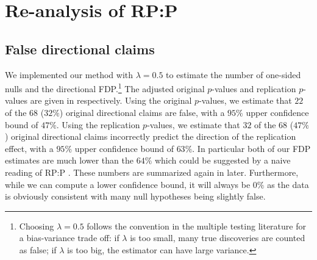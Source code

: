 \documentclass[11pt]{article}
\theoremstyle{definition}
\theoremstyle{custom}
\begin{document}
\section{Re-analysis of RP:P}
\label{sec:analysis}

\subsection{False directional claims}

  We implemented our method with $\lambda = 0.5$ to estimate the number of one-sided nulls and the directional FDP.\footnote{Choosing $\lambda = 0.5$ follows the convention in the multiple testing literature for a bias-variance trade off: if $\lambda$ is too small, many true discoveries are counted as false; if $\lambda$ is too big, the estimator can have large variance.} The adjusted original $p$-values and replication $p$-values are given in  respectively. Using the original $p$-values, we estimate that $22$ of the $68$ ($32\%$) original directional claims are false, with a $95\%$ upper confidence bound of $47\%$. Using the replication $p$-values, we estimate that $32$ of the $68$ ($47\%$) original directional claims incorrectly predict the direction of the replication effect, with a $95\%$ upper confidence bound of $63\%$. In particular both of our FDP estimates are much lower than the $64\%$ which could be suggested by a naive reading of RP:P \citep[e.g.][]{Baker:2015kd}. These numbers are summarized again in  later. Furthermore, while we can compute a lower confidence bound, it will always be $0\%$ as the data is obviously consistent with many null hypotheses being slightly false.
\end{document}
